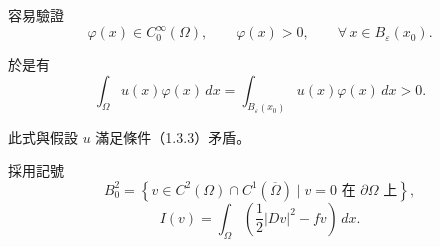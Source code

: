 \documentclass[11pt,a4paper,twoside]{article}
\newif\ifstudynotes
\newcommand{\StudyNote}[2]{%
    \ifstudynotes
    \begin{studyNote}[title={#1}]
    #2
    \end{studyNote}
    \fi
}
\newcommand{\pnum}[1]{%
    \makebox[0pt][r]{%
        \scriptsize\textbf{[#1]}\hspace{0.7em}%
    }%
}
\begin{document}
\newpage

\noindent
\pnum{14}
容易驗證
\[
    \varphi(x)\in C_0^\infty(\Omega),
    \qquad
    \varphi(x)>0,
    \qquad
    \forall\,x\in B_\varepsilon(x_0).
\]

於是有
\begin{equation*}
    \int_{\Omega}u(x)\varphi(x)\,dx
    =
    \int_{B_\varepsilon(x_0)}u(x)\varphi(x)\,dx
    >0.
\end{equation*}

此式與假設 $u$ 滿足條件（1.3.3）矛盾。

\StudyNote{複習註解：變分法基本引理的反證法收尾}{
    前面假設存在 $x_0\in\Omega$ 使 $u(x_0)>0$，並選取
    $\varphi\in C_0^\infty(\Omega)$，使它只在 $B_\varepsilon(x_0)$
    附近活動且保持正值。

    因此在 $B_\varepsilon(x_0)$ 中，
    \[
        u(x)>0,\qquad \varphi(x)>0,
    \]
    所以
    \[
        u(x)\varphi(x)>0.
    \]
    積分自然得到
    \[
        \int_\Omega u\varphi\,dx>0.
    \]
    但假設（1.3.3）要求對所有
    $\varphi\in C_0^\infty(\Omega)$ 都有
    \[
        \int_\Omega u\varphi\,dx=0,
    \]
    兩者矛盾，因此只能有 $u\equiv0$。

    \[
        \boxed{\text{測試函數 }\varphi\text{ 的作用：把 }u\text{ 在局部的正值「抓出來」}}
    \]
}

\vspace{0.4em}

\noindent
\pnum{15}
採用記號
\[
    B_0^2
    =
    \left\{
    v\in C^2(\Omega)\cap C^1(\overline{\Omega})
    \mid
    v=0\text{ 在 }\partial\Omega\text{ 上}
    \right\},
\]
\begin{equation}
    I(v)
    =
    \int_{\Omega}
    \left(
    \frac12 |Dv|^2-fv
    \right)\,dx.
    \tag{1.3.4}
\end{equation}

\StudyNote{複習註解：$B_0^2$ 與泛函 $I(v)$}{
    $B_0^2$ 是本節允許拿來比較的函數集合。對 $v\in B_0^2$：

    \[
        v\in C^2(\Omega)
    \]
    表示 $v$ 在 $\Omega$ 內具有連續的二階偏導數；

    \[
        v\in C^1(\overline{\Omega})
    \]
    表示 $v$ 與一階偏導數可以連續延伸到邊界；

    而
    \[
        v=0\qquad\text{在 }\partial\Omega\text{ 上}
    \]
    正是齊次 Dirichlet 邊界條件。

    泛函
    \[
        I(v)=\int_\Omega\left(\frac12|Dv|^2-fv\right)\,dx
    \]
    不是把一個點 $x$ 映成數，而是把「整個函數 $v$」映成一個實數。
    因此可以把 $I$ 想成函數空間上的「能量」。

    \[
        \boxed{v\longmapsto I(v)}
    \]
}
\end{document}
